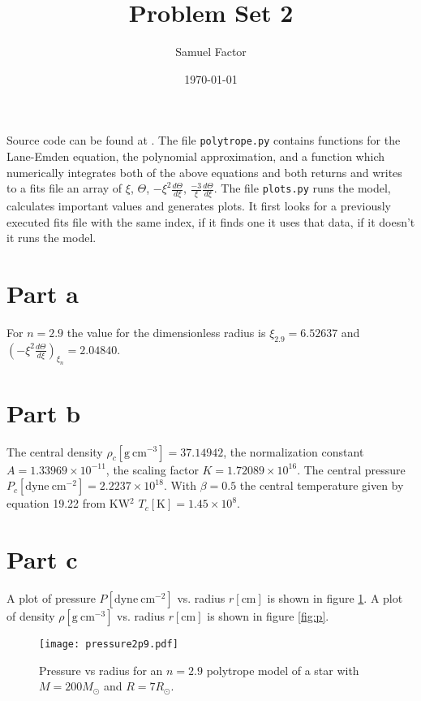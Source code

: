 \documentclass[12pt]{article}
\title{Problem Set 2}
\author{Samuel Factor}
\date{\today}                                           %
\begin{document}
\maketitle

Source code can be found at \url{}. The file \texttt{polytrope.py} contains functions for the Lane-Emden equation, the polynomial approximation, and a function which numerically integrates both of the above equations and both returns and writes to a fits file an array of $\xi$, $\Theta$, $-\xi^2 \frac{d\Theta}{d\xi}$, $\frac{-3}{\xi}\frac{d\Theta}{d\xi}$. The file \texttt{plots.py} runs the model, calculates important values and generates plots. It first looks for a previously executed fits file with the same index, if it finds one it uses that data, if it doesn't it runs the model. 

\section{Part a}
For $n=2.9$ the value for the dimensionless radius is $\xi_{2.9}=6.52637$ and $(-\xi^2\frac{d\Theta}{d\xi})_{\xi_n}=2.04840$.

\section{Part b}
The central density $\rho_c [\mathrm{g~cm^{-3}}] =37.14942$, the normalization constant $A=1.33969\times10^{-11}$, the scaling factor $K=1.72089\times10^{16}$. The central pressure $P_c [\mathrm{dyne~cm^{-2}}] = 2.2237\times10^{18}$. With $\beta=0.5$ the central temperature given by equation 19.22 from KW$^2$ $T_c[\mathrm{K}]=1.45\times10^8$.

\section{Part c}
A plot of pressure $P [\mathrm{dyne~cm^{-2}}]$ vs. radius $r [\mathrm{cm}]$ is shown in figure \ref{fig:P}. A plot of density $\rho [\mathrm{g~cm^{-3}}]$ vs. radius $r [\mathrm{cm}]$ is shown in figure \ref{fig:p}.

\begin{figure}[htbp]
\begin{center}
\texttt{[image: pressure2p9.pdf]}
\caption{Pressure vs radius for an $n=2.9$ polytrope model of a star with $M=200M_\odot$ and $R=7R_\odot$.}
\label{fig:P}
\end{center}
\end{figure}
\end{document}
